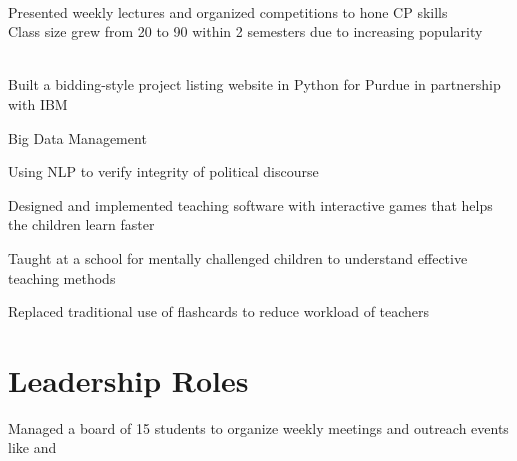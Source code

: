 \documentclass[]{deedy-resume-openfont}
\begin{document}
\begin{minipage}[t]{0.66\textwidth}
\begin{tightemize}
\item {}  \\ 
\textbullet{} Presented weekly lectures and organized competitions to hone CP skills \\
\textbullet{} Class size grew from 20 to 90 within 2 semesters due to increasing popularity\\
\item {}\\
\textbullet{} Built a bidding-style project listing website in Python for Purdue in partnership with IBM \\
\end{tightemize}
\sectionsep

\begin{tightemize}
\item Big Data Management
\item Using NLP to verify integrity of political discourse
\end{tightemize}
\sectionsep

\begin{tightemize}
\item Designed and implemented teaching software with interactive games that helps the children learn faster
\item Taught at a school for mentally challenged children to understand effective teaching methods
\item Replaced traditional use of flashcards to reduce workload of teachers
\end{tightemize}
\sectionsep


\section{Leadership Roles}

\begin{tightemize}
\item Managed a board of 15 students to organize weekly meetings and outreach events like  and 
\end{tightemize}
\sectionsep


\end{minipage} 
\end{document}
